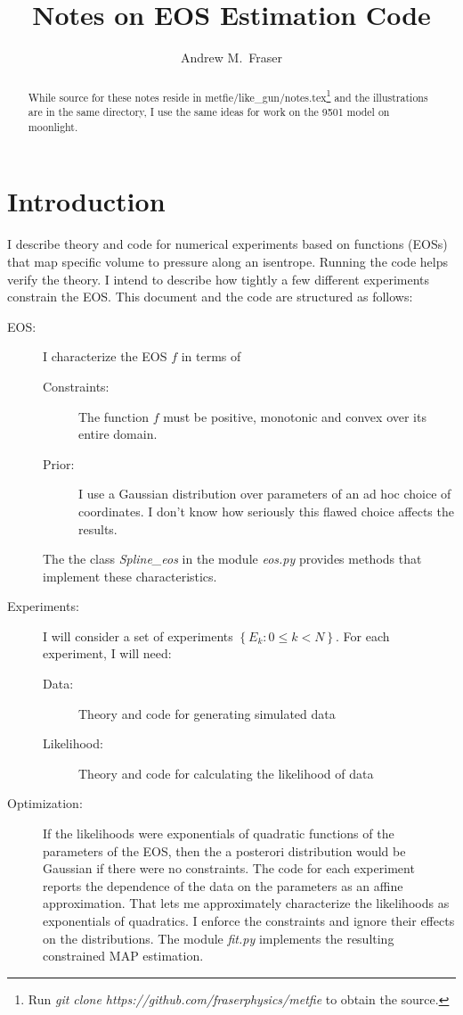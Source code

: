 \documentclass[11pt]{article}
\title{Notes on EOS Estimation Code}
\author{Andrew M.\ Fraser}
\begin{document}
\maketitle
\begin{abstract}
  While source for these notes reside in
  metfie/like\_gun/notes.tex\footnote{Run \emph{git clone
      https://github.com/fraserphysics/metfie} to obtain the source.}
    and the illustrations are in the same directory, I use the same
    ideas for work on the 9501 model on moonlight.
\end{abstract}

\section{Introduction}
\label{sec:introduction}

I describe theory and code for numerical experiments based on functions
(EOSs) that map specific volume to pressure along an isentrope.
Running the code helps verify the theory.  I intend to describe how
tightly a few different experiments constrain the EOS.  This document
and the code are structured as follows:
\begin{description}
\item[EOS:] I characterize the EOS $f$ in terms of
  \begin{description}
  \item[Constraints:] The function $f$ must be positive, monotonic and
    convex over its entire domain.
  \item[Prior:] I use a Gaussian distribution over parameters of an ad
    hoc choice of coordinates.  I don't know how seriously this flawed
    choice affects the results.
  \end{description}
  The the class \emph{Spline\_eos} in the module \emph{eos.py}
  provides methods that implement these characteristics.
\item[Experiments:] I will consider a set of experiments
  $\left\{ E_k: 0 \leq k < N \right\}$.  For each experiment, I will
  need:
  \begin{description}
  \item[Data:] Theory and code for generating simulated data
  \item[Likelihood:] Theory and code for calculating the likelihood of
    data
  \end{description}
\item[Optimization:] If the likelihoods were exponentials of quadratic
  functions of the parameters of the EOS, then the a posterori
  distribution would be Gaussian if there were no constraints.  The
  code for each experiment reports the dependence of the data on the
  parameters as an affine approximation.  That lets me approximately
  characterize the likelihoods as exponentials of quadratics.  I
  enforce the constraints and ignore their effects on the
  distributions.  The module \emph{fit.py} implements the resulting
  constrained MAP estimation.
\end{description}
\end{document}
